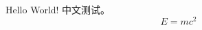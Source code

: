 \documentclass{article}
\begin{document}
Hello   World! 中文测试。
\begin{equation}
E = mc^2
\end{equation}
\end{document}
